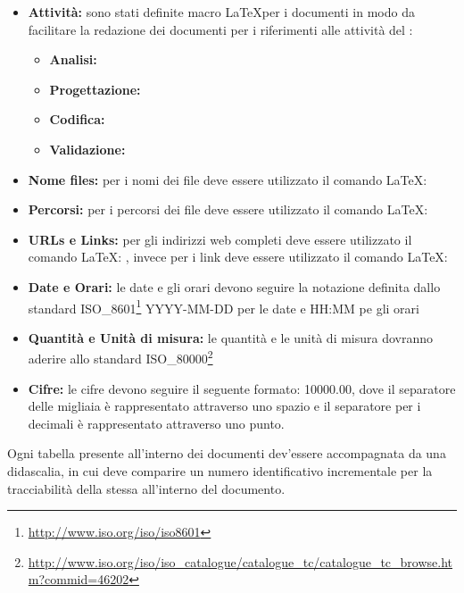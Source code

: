 \documentclass[12pt,a4paper]{article}
\begin{document}
\begin{itemize}
\begin{itemize}
		\item \textbf{\MU:} 
	\end{itemize}
	\item \textbf{Attività:} sono stati definite macro  \LaTeX per i documenti in modo da facilitare la redazione dei documenti per i riferimenti alle attività del \PdP:
	\begin{itemize}
		\item \textbf{Analisi:} 
		\item \textbf{Progettazione:} 
		\item \textbf{Codifica:} 
		\item \textbf{Validazione:} 
	\end{itemize}
\end{itemize}

\label{formati}
\begin{itemize}
	\item \textbf{Nome files:} per i nomi dei file deve essere utilizzato il comando \LaTeX: 
	\item  \textbf{Percorsi:} per i percorsi dei file deve essere utilizzato il comando \LaTeX: 
	\item \textbf{URLs e Links:}  per gli indirizzi web completi deve essere utilizzato il comando \LaTeX: , invece per i link deve essere utilizzato il comando \LaTeX: 
	\item \textbf{Date e Orari:} le date e gli orari devono seguire la notazione definita dallo standard ISO\_8601\footnote{\url{http://www.iso.org/iso/iso8601}} YYYY-MM-DD per le date e HH:MM pe gli orari
	\item \textbf{Quantità e Unità di misura:} le quantità e le unità di misura dovranno aderire allo standard ISO\_80000\footnote{\url{http://www.iso.org/iso/iso_catalogue/catalogue_tc/catalogue_tc_browse.htm?commid=46202}}
	\item \textbf{Cifre:} le cifre devono seguire il seguente formato: \num{10000.00}, dove il separatore delle migliaia è rappresentato attraverso uno spazio e il separatore per i decimali è rappresentato attraverso uno punto.
\end{itemize}

Ogni tabella presente all'interno dei documenti dev'essere accompagnata da una didascalia, in cui deve comparire un numero identificativo incrementale per la tracciabilità della stessa all'interno del documento.
\end{document}
